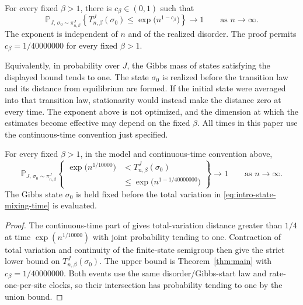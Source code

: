 \begin{theorem}\label{thm:main}
For every fixed $\beta>1$, there is $c_\beta\in(0,1)$ such that
\[
 \mathbb P_{J,\,\sigma_0\sim\pi_{n,\beta}^J}
 \left\{T_{n,\beta}^J(\sigma_0)
       \le\exp\bigl(n^{1-c_\beta}\bigr)\right\}
 \longrightarrow1
 \qquad\text{as }n\longrightarrow\infty.
\]
The exponent is independent of $n$ and of the realized disorder.
The proof permits $c_\beta=1/40000000$ for every fixed $\beta>1$.
\end{theorem}

Equivalently, in probability over $J$, the Gibbs mass of states
satisfying the displayed bound tends to one. The state $\sigma_0$ is
realized before the transition law and its distance from equilibrium
are formed. If the initial state were averaged into that transition law,
stationarity would instead make the distance zero at every time.
The exponent above is not optimized, and the dimension at which the
estimates become effective may depend on the fixed $\beta$. All times
in this paper use the continuous-time convention just specified.

\begin{corollary}\label{cor:typical-two-sided}
For every fixed $\beta>1$, in the model and continuous-time convention
above,
\[
 \mathbb P_{J,\,\sigma_0\sim\pi_{n,\beta}^J}
 \left\{
 \begin{aligned}
  \exp\bigl(n^{1/10000}\bigr)&<T_{n,\beta}^J(\sigma_0)\\
  &\le\exp\bigl(n^{1-1/40000000}\bigr)
 \end{aligned}
 \right\}\longrightarrow1
 \qquad\text{as }n\longrightarrow\infty.
\]
The Gibbs state $\sigma_0$ is held fixed before the total variation in
\eqref{eq:intro-state-mixing-time} is evaluated.
\end{corollary}

\begin{proof}
The continuous-time part of \cite[Theorem~1.1]{OpenAISKBarriers2026}
gives total-variation distance greater than $1/4$ at time
$\exp(n^{1/10000})$ with joint probability tending to one. Contraction
of total variation and continuity of the finite-state semigroup then
give the strict lower bound on $T_{n,\beta}^J(\sigma_0)$.
The upper bound is Theorem~\ref{thm:main} with
$c_\beta=1/40000000$. Both events use the same disorder/Gibbs-start law
and rate-one-per-site clocks, so their intersection has probability
tending to one by the union bound.
\end{proof}

